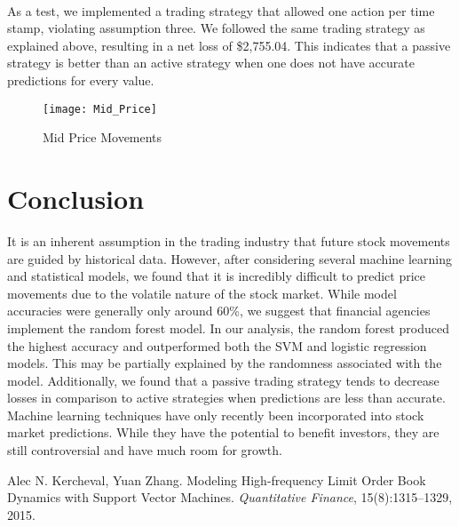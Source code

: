 \documentclass[11pt]{article}
\begin{document}
\\
As a test, we implemented a trading strategy that allowed one action per time stamp, violating assumption three. We followed the same trading strategy as explained above, resulting in a net loss of \$2,755.04. This indicates that a passive strategy is better than an active strategy when one does not have accurate predictions for every value. 

\begin{figure}
  \centering
    \texttt{[image: Mid\_Price]}
  \caption{Mid Price Movements}
  \label{fig:find6}
\end{figure}

\section{Conclusion}
It is an inherent assumption in the trading industry that future stock movements are guided by historical data. However, after considering several machine learning and statistical models, we found that it is incredibly difficult to predict price movements due to the volatile nature of the stock market. While model accuracies were generally only around 60\%, we suggest that financial agencies implement the random forest model. In our analysis, the random forest produced the highest accuracy and outperformed both the SVM and logistic regression models. This may be partially explained by the randomness associated with the model. Additionally, we found that a passive trading strategy tends to decrease losses in comparison to active strategies when predictions are less than accurate. Machine learning techniques have only recently been incorporated into stock market predictions. While they have the potential to benefit investors, they are still controversial and have much room for growth. 




\begin{thebibliography}{9}

Alec N. Kercheval, Yuan Zhang. Modeling High-frequency Limit Order Book Dynamics with Support Vector Machines.
\textit{Quantitative Finance}, 15(8):1315–1329, 2015.

\end{thebibliography}
\end{document}
